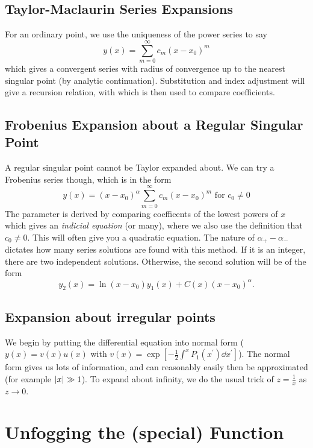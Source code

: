 \documentclass[a4paper,12pt,parskip=full,BCOR=1cm]{scrreprt}
\begin{document}
\section{Taylor-Maclaurin Series Expansions}
For an ordinary point, we use the uniqueness of the power series to say
$$ y(x) = \sum_{m=0}^\infty c_m(x-x_0)^m $$
which gives a convergent series with radius of convergence up to the nearest singular point (by analytic continuation).
Substitution and index adjustment will give a recursion relation, with which is then used to compare coefficients.

\section{Frobenius Expansion about a Regular Singular Point}
A regular singular point cannot be Taylor expanded about.
We can try a Frobenius series though, which is in the form
\begin{equation*}
 y(x)= (x-x_0)^\alpha \sum_{m=0}^\infty c_m(x-x_0)^m \text{ for }c_0 \neq 0
\end{equation*}
The parameter is derived by comparing coefficents of the lowest powers of $x$ which gives an \emph{indicial equation} (or many), where we also use the definition that $c_0\neq 0$.
This will often give you a quadratic equation.
The nature of $\alpha_+ - \alpha_-$ dictates how many series solutions are found with this method.
If it is an integer, there are two independent solutions.
Otherwise, the second solution will be of the form
$$ y_2(x) = \ln(x-x_0)y_1(x) + C(x)(x-x_0)^{\alpha}.$$

\section{Expansion about irregular points}
We begin by putting the differential equation into normal form ($y(x)=v(x)u(x)$ with $v(x)=\exp[-\frac{1}{2}\int^x P_1(x^\prime) \dd{x^\prime}]$).
The normal form gives us lots of information, and can reasonably easily then be approximated (for example $\abs{x} \gg 1$).
To expand about infinity, we do the usual trick of $z = \frac{1}{x}$ as $z\rightarrow 0$.

\chapter{Unfogging the (special) Function}
\end{document}
